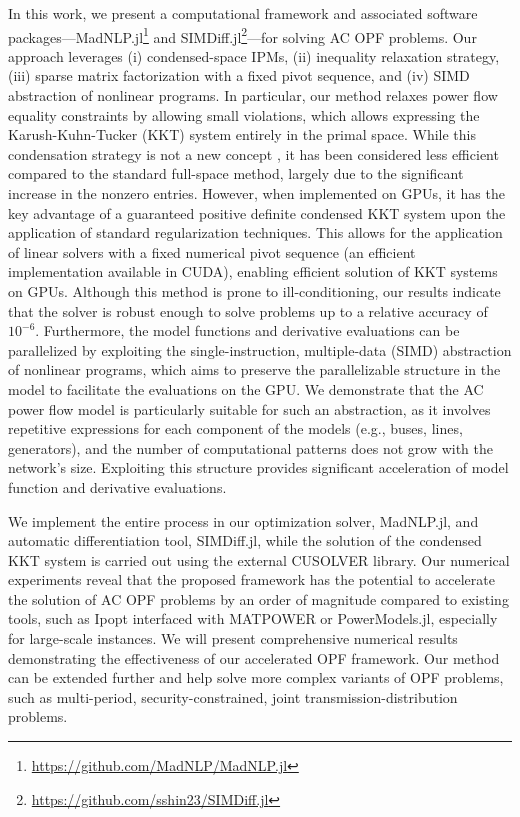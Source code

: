 In this work, we present a computational framework and associated software packages—MadNLP.jl\footnote{\url{https://github.com/MadNLP/MadNLP.jl}} and SIMDiff.jl\footnote{\url{https://github.com/sshin23/SIMDiff.jl}}—for solving AC OPF problems. Our approach leverages (i) condensed-space IPMs, (ii) inequality relaxation strategy, (iii) sparse matrix factorization with a fixed pivot sequence, and (iv) SIMD abstraction of nonlinear programs. In particular, our method relaxes power flow equality constraints by allowing small violations, which allows expressing the Karush-Kuhn-Tucker (KKT) system entirely in the primal space. While this condensation strategy is not a new concept \cite{nocedal2006numerical}, it has been considered less efficient compared to the standard full-space method, largely due to the significant increase in the nonzero entries. However, when implemented on GPUs, it has the key advantage of a guaranteed positive definite condensed KKT system upon the application of standard regularization techniques. This allows for the application of linear solvers with a fixed numerical pivot sequence (an efficient implementation available in CUDA), enabling efficient solution of KKT systems on GPUs. Although this method is prone to ill-conditioning, our results indicate that the solver is robust enough to solve problems up to a relative accuracy of $10^{-6}$. Furthermore, the model functions and derivative evaluations can be parallelized by exploiting the single-instruction, multiple-data (SIMD) abstraction of nonlinear programs, which aims to preserve the parallelizable structure in the model to facilitate the evaluations on the GPU. We demonstrate that the AC power flow model is particularly suitable for such an abstraction, as it involves repetitive expressions for each component of the models (e.g., buses, lines, generators), and the number of computational patterns does not grow with the network's size. Exploiting this structure provides significant acceleration of model function and derivative evaluations.

We implement the entire process in our optimization solver, MadNLP.jl, and automatic differentiation tool, SIMDiff.jl, while the solution of the condensed KKT system is carried out using the external CUSOLVER library. Our numerical experiments reveal that the proposed framework has the potential to accelerate the solution of AC OPF problems by an order of magnitude compared to existing tools, such as Ipopt interfaced with MATPOWER or PowerModels.jl, especially for large-scale instances. We will present comprehensive numerical results demonstrating the effectiveness of our accelerated OPF framework. Our method can be extended further and help solve more complex variants of OPF problems, such as multi-period, security-constrained, joint transmission-distribution problems.

\pagebreak
\thispagestyle{empty}





